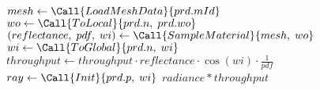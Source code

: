 \begin{algorithm}
    \begin{algorithmic}[1] %
                \State $mesh \gets \Call{LoadMeshData}{prd.mId}$
                \State $wo \gets \Call{ToLocal}{prd.n,\;prd.wo}$
                \State
                \State $(reflectance,\;pdf,\;wi) \gets \Call{SampleMaterial}{mesh,\;wo}$
                \State $wi \gets \Call{ToGlobal}{prd.n,\;wi}$
                \State
                \State $throughput \gets throughput \cdot reflectance \cdot \cos(wi) \cdot \frac{1}{pdf}$
                \EndIf
                \State $ray \gets \Call{Init}{prd.p,\;wi}$
                \State
            \EndWhile
            \State
            \Return $radiance * throughput$
        \EndProcedure
    \end{algorithmic}
\end{algorithm}

